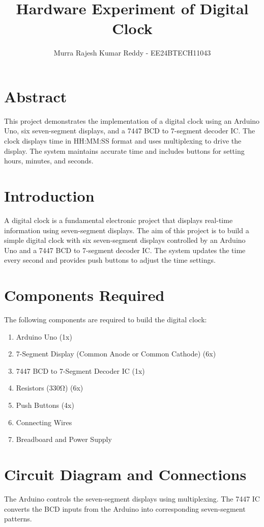 \documentclass[journal,12pt,onecolumn,article]{IEEEtran}
\title{Hardware Experiment of Digital Clock}
\author{Murra Rajesh Kumar Reddy - EE24BTECH11043}
\theoremstyle{remark}
\begin{document}
\maketitle

\section{Abstract}
This project demonstrates the implementation of a digital clock using an Arduino Uno, six seven-segment displays, and a 7447 BCD to 7-segment decoder IC. The clock displays time in HH:MM:SS format and uses multiplexing to drive the display. The system maintains accurate time and includes buttons for setting hours, minutes, and seconds.

\section{Introduction}
A digital clock is a fundamental electronic project that displays real-time information using seven-segment displays. The aim of this project is to build a simple digital clock with six seven-segment displays controlled by an Arduino Uno and a 7447 BCD to 7-segment decoder IC. The system updates the time every second and provides push buttons to adjust the time settings.

\section{Components Required}
The following components are required to build the digital clock:

\begin{enumerate}
    \item Arduino Uno (1x)
    \item 7-Segment Display (Common Anode or Common Cathode) (6x)
    \item 7447 BCD to 7-Segment Decoder IC (1x)
    \item Resistors (330Ω) (6x)
    \item Push Buttons (4x)
    \item Connecting Wires
    \item Breadboard and Power Supply
\end{enumerate}

\section{Circuit Diagram and Connections}
The Arduino controls the seven-segment displays using multiplexing. The 7447 IC converts the BCD inputs from the Arduino into corresponding seven-segment patterns.
\end{document}
